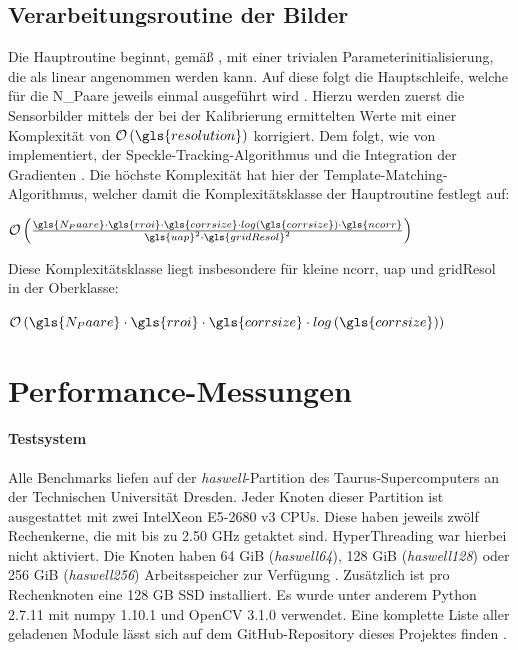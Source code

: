 \subsection{Verarbeitungsroutine der Bilder}

Die Hauptroutine beginnt, gemäß \cite{Coj17}, mit einer trivialen Parameterinitialisierung, die als linear angenommen werden kann. Auf diese folgt die Hauptschleife, welche für die \gls{N_Paare} jeweils einmal ausgeführt wird \cite{Coj17}. Hierzu werden zuerst die Sensorbilder mittels der bei der Kalibrierung ermittelten Werte mit einer Komplexität von $\mathcal{O}\left(\gls{resolution}\right)$ korrigiert. Dem folgt, wie von \citeauthor{Coj17} implementiert, der Speckle-Tracking-Algorithmus und die Integration der Gradienten \cite{Coj17}. Die höchste Komplexität hat hier der Template-Matching-Algorithmus, welcher damit die Komplexitätsklasse der Hauptroutine festlegt auf:

\begin{center}
	$\mathcal{O}\left(\frac{\gls{N_Paare} \cdot\gls{rroi} \cdot \gls{corrsize} \cdot log\left(\gls{corrsize}\right) \cdot \gls{ncorr}}{\gls{uap}^2 \cdot \gls{gridResol}^2}\right)$
\end{center}

Diese Komplexitätsklasse liegt insbesondere für kleine \gls{ncorr}, \gls{uap} und \gls{gridResol} in der Oberklasse:

\begin{center}
	$\mathcal{O}\left(\gls{N_Paare} \cdot \gls{rroi} \cdot \gls{corrsize} \cdot log\left(\gls{corrsize}\right)\right)$
\end{center}

\section{Performance-Messungen}

\label{sec:performance-messungen}

\paragraph{Testsystem}

\begin{sloppypar}
Alle Benchmarks liefen auf der \textit{haswell}-Partition des Taurus-Supercomputers an der Technischen Universität Dresden. Jeder Knoten dieser Partition ist ausgestattet mit zwei Intel\textregistered \mbox{Xeon\textregistered} E5-2680 v3 \glspl{CPU}. Diese haben jeweils zwölf Rechenkerne, die mit bis zu 2.50 \gls{GHz} getaktet sind. HyperThreading war hierbei nicht aktiviert. Die Knoten haben 64 \gls{GiB} (\textit{haswell64}), 128 \gls{GiB} (\textit{haswell128}) oder 256 \gls{GiB} (\textit{haswell256}) Arbeitsspeicher zur Verfügung \cite{Mar17}. Zusätzlich ist pro Rechenknoten eine 128 \gls{GB} \gls{SSD} installiert. Es wurde unter anderem Python 2.7.11 mit numpy 1.10.1 und OpenCV 3.1.0 verwendet. Eine komplette Liste aller geladenen Module lässt sich auf dem GitHub-Repository dieses Projektes finden \cite{Sch18a}.
\end{sloppypar}

